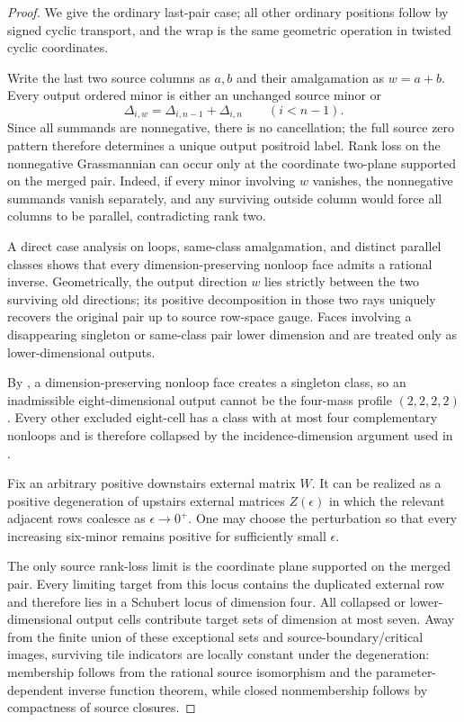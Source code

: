 \documentclass[11pt]{article}
\newcommand{\1}{\mathbf 1}
\begin{document}
\begin{proof}
We give the ordinary last-pair case; all other ordinary positions follow
by signed cyclic transport, and the wrap is the same geometric operation in
twisted cyclic coordinates.

Write the last two source columns as $a,b$ and their amalgamation as
$w=a+b$.  Every output ordered minor is either an unchanged source minor
or
\[
\Delta_{i,w}=\Delta_{i,n-1}+\Delta_{i,n}\qquad(i<n-1).
\]
Since all summands are nonnegative, there is no cancellation; the full
source zero pattern therefore determines a unique output positroid label.
Rank loss on the nonnegative Grassmannian can occur only at the coordinate
two-plane supported on the merged pair.  Indeed, if every minor involving
$w$ vanishes, the nonnegative summands vanish separately, and any surviving
outside column would force all columns to be parallel, contradicting rank
two.

A direct case analysis on loops, same-class amalgamation, and distinct
parallel classes shows that every dimension-preserving nonloop face admits
a rational inverse.  Geometrically, the output direction $w$ lies strictly
between the two surviving old directions; its positive decomposition in
those two rays uniquely recovers the original pair up to source row-space
gauge.  Faces involving a disappearing singleton or same-class pair lower
dimension and are treated only as lower-dimensional outputs.

By , a dimension-preserving nonloop face creates a
singleton class, so an inadmissible eight-dimensional output cannot be the
four-mass profile $(2,2,2,2)$.  Every other excluded eight-cell has a class
with at most four complementary nonloops and is therefore collapsed by the
incidence-dimension argument used in .

Fix an arbitrary positive downstairs external matrix $W$.  It can be
realized as a positive degeneration of upstairs external matrices
$Z(\epsilon)$ in which the relevant adjacent rows coalesce as
$\epsilon\to0^+$.  One may choose the perturbation so that every increasing
six-minor remains positive for sufficiently small $\epsilon$.

The only source rank-loss limit is the coordinate plane supported on the
merged pair.  Every limiting target from this locus contains the duplicated
external row and therefore lies in a Schubert locus of dimension four.
All collapsed or lower-dimensional output cells contribute target sets of
dimension at most seven.  Away from the finite union of these exceptional
sets and source-boundary/critical images, surviving tile indicators are
locally constant under the degeneration: membership follows from the
rational source isomorphism and the parameter-dependent inverse function
theorem, while closed nonmembership follows by compactness of source
closures.


\end{proof}
\end{document}
